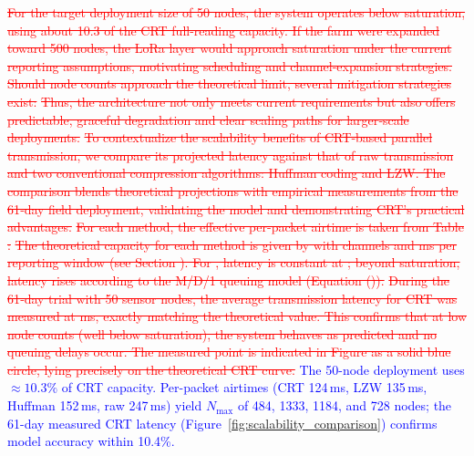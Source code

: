 \documentclass[pdflatex,sn-mathphys-num]{sn-jnl}
\theoremstyle{thmstyleone}
\theoremstyle{thmstyletwo}
\theoremstyle{thmstylethree}
\begin{document}
{\textcolor{red}{\sout{For the target deployment size of 50 nodes, the system operates below saturation, using about 10.3 of the CRT full-reading capacity. If the farm were expanded toward 500 nodes, the LoRa layer would approach saturation under the current reporting assumptions, motivating scheduling and channel-expansion strategies. Should node counts approach the theoretical limit, several mitigation strategies exist:}}
\textcolor{red}{\sout{Thus, the architecture not only meets current requirements but also offers predictable, graceful degradation and clear scaling paths for larger‑scale deployments.}}
\textcolor{red}{\sout{To contextualize the scalability benefits of CRT‑based parallel transmission, we compare its projected latency against that of raw transmission and two conventional compression algorithms: Huffman coding and LZW. The comparison blends theoretical projections with empirical measurements from the 61‑day field deployment, validating the model and demonstrating CRT's practical advantages.}}
\textcolor{red}{\sout{For each method, the effective per-packet airtime is taken from Table :}}
\textcolor{red}{\sout{The theoretical capacity for each method is given by with channels and ms per reporting window (see Section ). For , latency is constant at ; beyond saturation, latency rises according to the M/D/1 queuing model (Equation ()).}}
\textcolor{red}{\sout{During the 61‑day trial with 50 sensor nodes, the average transmission latency for CRT was measured at ms, exactly matching the theoretical value. This confirms that at low node counts (well below saturation), the system behaves as predicted and no queuing delays occur. The measured point is indicated in Figure as a solid blue circle, lying precisely on the theoretical CRT curve.}}
\textcolor{blue}{The 50-node deployment uses $\approx10.3\%$ of CRT capacity. Per-packet airtimes (CRT 124\,ms, LZW 135\,ms, Huffman 152\,ms, raw 247\,ms) yield $N_{\max}$ of 484, 1333, 1184, and 728 nodes; the 61-day measured CRT latency (Figure~\ref{fig:scalability_comparison}) confirms model accuracy within 10.4\%.}

\begin{figure}[!htbp]
\centering
{}
\end{figure}}
\end{document}
